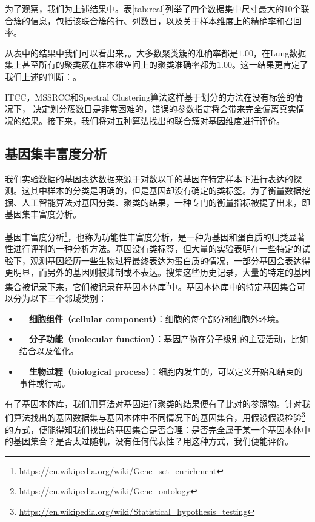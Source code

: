 为了观察，我们为上述结果中。表\ref{tab:real}列举了四个数据集中尺寸最大的10个联合簇的信息，包括该联合簇的行、列数目，以及关于样本维度上的精确率和召回率。




从表中的结果中我们可以看出来，。大多数聚类簇的准确率都是$1.00$，在Lung数据集上甚至所有的聚类簇在样本维空间上的聚类准确率都为$1.00$。这一结果更肯定了我们上述的判断：。

ITCC，MSSRCC和Spectral Clustering算法这样基于划分的方法在没有标签的情况下， 决定划分簇数目是非常困难的，错误的参数指定将会带来完全偏离真实情况的结果。接下来，我们将对五种算法找出的联合簇对基因维度进行评价。

\subsection{基因集丰富度分析}
\label{subsec:analysis}
我们实验数据的基因表达数据来源于对数以千的基因在特定样本下进行表达的探测。这其中样本的分类是明确的，但是基因却没有确定的类标签。为了衡量数据挖掘、人工智能算法对基因分类、聚类的结果，一种专门的衡量指标被提了出来，即基因集丰富度分析。

基因丰富度分析\footnote{\url{https://en.wikipedia.org/wiki/Gene_set_enrichment}}，也称为功能性丰富度分析，是一种为基因和蛋白质的归类显著性进行评判的一种分析方法。基因没有类标签，但大量的实验表明在一些特定的试验下，观测基因经历一些生物过程最终表达为蛋白质的情况，一部分基因会表达得更明显，而另外的基因则被抑制或不表达。搜集这些历史记录，大量的特定的基因集合被记录下来，它们被记录在基因本体库\footnote{\url{https://en.wikipedia.org/wiki/Gene_ontology}}中。基因本体库中的特定基因集合可以分为以下三个邻域类别：
\begin{itemize}
\item \textbf{~~细胞组件（cellular component）}：细胞的每个部分和细胞外环境。
\item \textbf{~~分子功能（molecular function）}：基因产物在分子级别的主要活动，比如结合以及催化。
\item \textbf{~~生物过程（biological process）}：细胞内发生的，可以定义开始和结束的事件或行动。
\end{itemize}

有了基因本体库，我们用算法对基因进行聚类的结果便有了比对的参照物。针对我们算法找出的基因数据集与基因本体中不同情况下的基因集合，用假设假设检验\footnote{\url{https://en.wikipedia.org/wiki/Statistical_hypothesis_testing}}的方式，便能得知我们找出的基因集合是否合理：是否完全属于某一个基因本体中的基因集合？是否太过随机，没有任何代表性？用这种方式，我们便能评价。


